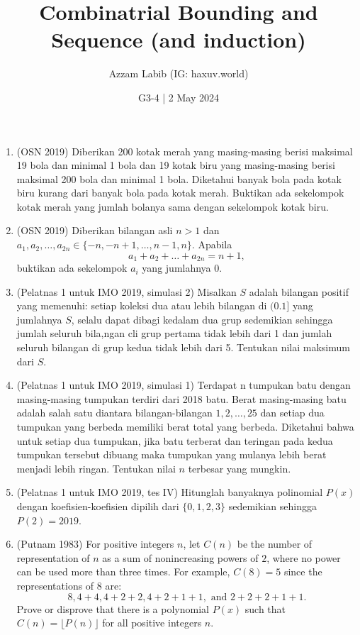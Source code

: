 \documentclass[12pt]{scrartcl}
\title{Combinatrial Bounding and Sequence (and induction)}
\author{Azzam Labib (IG: haxuv.world)}
\date{G3-4 | 2 May 2024}
\begin{document}
\maketitle

\renewcommand*\contentsname{Daftar Isi}
\tableofcontents

\newpage

\begin{enumerate}
    \item (OSN 2019) Diberikan 200 kotak merah yang masing-masing berisi maksimal 19 bola dan minimal 1 bola dan 19 kotak biru yang masing-masing berisi maksimal 200 bola dan minimal 1 bola. Diketahui banyak bola pada kotak biru kurang dari banyak bola pada kotak merah. Buktikan ada sekelompok kotak merah yang jumlah bolanya sama dengan sekelompok kotak biru.

    \item (OSN 2019) Diberikan bilangan asli $n >1$ dan $a_1,a_2,\ldots,a_{2n} \in \{-n,-n+1, \ldots, n-1,n\}$. Apabila
    $$a_1+a_2+\ldots+a_{2n}=n+1,$$
    buktikan ada sekelompok $a_i$ yang jumlahnya 0.

    \item (Pelatnas 1 untuk IMO 2019, simulasi 2) Misalkan $S$ adalah bilangan positif yang memenuhi: setiap koleksi dua atau lebih bilangan di $(0. 1]$ yang jumlahnya $S$, selalu dapat dibagi kedalam dua grup sedemikian sehingga jumlah seluruh bila,ngan cli grup pertama tidak lebih dari 1 dan jumlah seluruh bilangan di grup kedua tidak lebih dari 5. Tentukan nilai maksimum dari $S$. 

    \item (Pelatnas 1 untuk IMO 2019, simulasi 1) Terdapat n tumpukan batu dengan masing-masing tumpukan terdiri dari 2018 batu. Berat masing-masing batu adalah salah satu diantara bilangan-bilangan $1,2,\ldots,25$ dan setiap dua tumpukan yang berbeda memiliki berat total yang berbeda. Diketahui bahwa untuk setiap dua tumpukan, jika batu terberat dan teringan pada kedua tumpukan tersebut dibuang maka tumpukan yang mulanya lebih berat menjadi lebih ringan. Tentukan nilai $n$ terbesar yang mungkin. 

    \item (Pelatnas 1 untuk IMO 2019, tes IV) Hitunglah banyaknya polinomial $P(x)$ dengan koefisien-koefisien dipilih dari $\{0,1,2,3\}$ sedemikian sehingga $P(2)=2019$.

    \item (Putnam 1983) For positive integers $n$, let $C(n)$ be the number of representation of $n$ as a sum of nonincreasing powers of $2$, where no power can be used more than three times. For example, $C(8)=5$ since the representations of $8$ are:
    $$8,4+4,4+2+2,4+2+1+1,\text{ and }2+2+2+1+1.$$
    Prove or disprove that there is a polynomial $P(x)$ such that $C(n)=\lfloor P(n)\rfloor$ for all positive integers $n$.
\end{enumerate}
\end{document}
